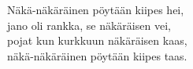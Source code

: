
Näkä-näkäräinen pöytään kiipes hei, \\ jano oli rankka, se näkäräisen vei, \\ pojat kun kurkkuun näkäräisen kaas, \\ näkä-näkäräinen pöytään kiipes taas.